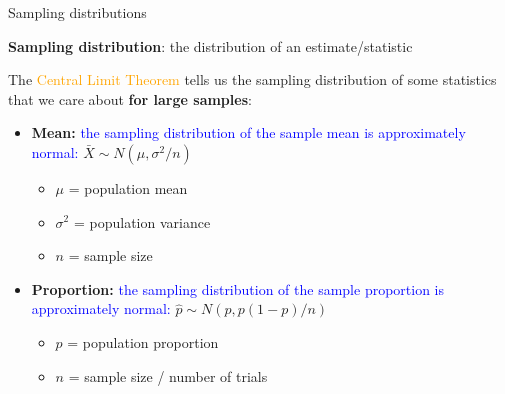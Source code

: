\documentclass[10pt,t]{beamer}
\begin{document}
\begin{frame}{Sampling distributions}

\textbf{Sampling distribution}: the distribution of an estimate/statistic

\vspace{0.3cm}

The \textcolor{orange}{Central Limit Theorem} tells us the sampling distribution of some statistics that we care about \textbf{for large samples}:
\medskip
\begin{itemize}
	\item \textbf{Mean:} \textcolor{blue}{the sampling distribution of the sample mean is approximately normal:} $\bar{X} \sim N(\mu, \sigma^2 / n)$
	\smallskip
	\begin{itemize}
		\item $\mu$ = population mean
		\smallskip
		\item $\sigma^2$ = population variance
		\smallskip
		\item $n$ = sample size
	\end{itemize}
\medskip
	\item \textbf{Proportion:} \textcolor{blue}{the sampling distribution of the sample proportion is approximately normal:} $ \hat{p} \sim N(p, p(1-p)/n)$
	\begin{itemize}
		\smallskip
		\item $p$ = population proportion
		\smallskip
		\item $n$ = sample size / number of trials
	\end{itemize}
\end{itemize}
\end{frame}
\end{document}
